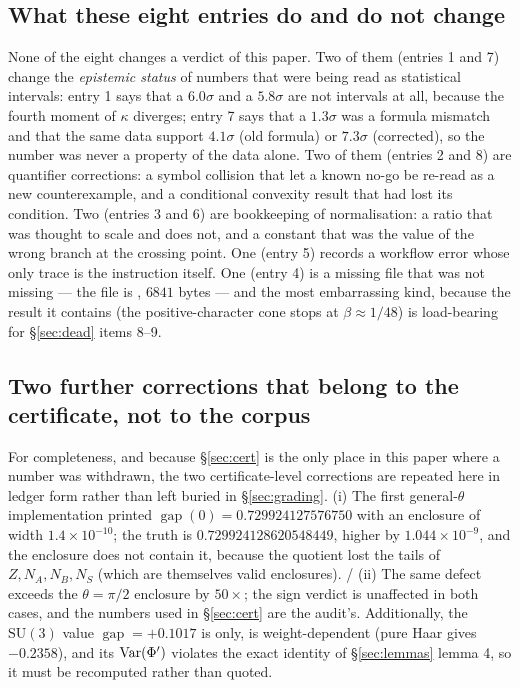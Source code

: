 \subsection{What these eight entries do and do not change}

None of the eight changes a \LT{} verdict of this paper. Two of them (entries 1 and 7) change the
\emph{epistemic status} of numbers that were being read as statistical intervals: entry 1 says
that a $6.0\sigma$ and a $5.8\sigma$ are not intervals at all, because the fourth moment of
$\kappa$ diverges; entry 7 says that a $1.3\sigma$ was a formula mismatch and that the same data
support $4.1\sigma$ (old formula) or $7.3\sigma$ (corrected), so the number was never a property
of the data alone. Two of them (entries 2 and 8) are quantifier corrections: a symbol collision
that let a known no-go be re-read as a new counterexample, and a conditional convexity result that
had lost its condition. Two (entries 3 and 6) are bookkeeping of normalisation: a ratio that was
thought to scale and does not, and a constant that was the value of the wrong branch at the
crossing point. One (entry 5) records a workflow error whose only trace is the instruction itself.
One (entry 4) is a missing file that was not missing --- the file is
, $6841$ bytes --- and the most embarrassing kind,
because the result it contains (the positive-character cone stops at $\beta\approx1/48$) is
load-bearing for \S\ref{sec:dead} items 8--9.


\subsection{Two further corrections that belong to the certificate, not to the corpus}
\label{sec:errata2}

For completeness, and because \S\ref{sec:cert} is the only place in this paper where a number was
withdrawn, the two certificate-level corrections are repeated here in ledger form rather than left
buried in \S\ref{sec:grading}. (i) The first general-$\theta$ implementation printed
$\operatorname{gap}(0)=0.729924127576750$ with an enclosure of width $1.4\times10^{-10}$; the truth
is $0.729924128620548449$, higher by $1.044\times10^{-9}$, and the enclosure does not contain it,
because the quotient lost the tails of $Z,N_A,N_B,N_S$ (which are themselves valid enclosures).
\LT{}/\LE{} (ii) The same defect exceeds the $\theta=\pi/2$ enclosure by $50\times$; the sign
verdict is unaffected in both cases, and the numbers used in \S\ref{sec:cert} are the audit's.
Additionally, the $\mathrm{SU}(3)$ value $\operatorname{gap}=+0.1017$ is \LE{} only, is
weight-dependent (pure Haar gives $-0.2358$), and its $\operatorname{Var}(\Phi')$ violates the exact identity of
\S\ref{sec:lemmas} lemma 4, so it must be recomputed rather than quoted.

